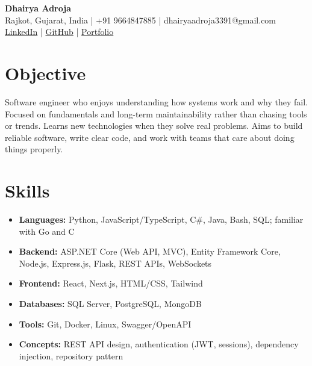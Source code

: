 \documentclass[11pt,a4paper]{article}
\begin{document}
\begin{center}
    {\huge \textbf{Dhairya Adroja}} \\
    \vspace{6pt}
    \small Rajkot, Gujarat, India | +91 9664847885 | dhairyaadroja3391@gmail.com \\
    \small \href{https://www.linkedin.com/in/adrojadhairya}{LinkedIn} | \href{https://github.com/Dhairya3391}{GitHub} | \href{https://pow.noobokay.me}{Portfolio}
\end{center}

\section{Objective}
\noindent Software engineer who enjoys understanding how systems work and why they fail. Focused on fundamentals and long-term maintainability rather than chasing tools or trends. Learns new technologies when they solve real problems. Aims to build reliable software, write clear code, and work with teams that care about doing things properly.

\section{Skills}
\begin{itemize}[leftmargin=*]
\item \textbf{Languages:} Python, JavaScript/TypeScript, C\#, Java, Bash, SQL; familiar with Go and C
\item \textbf{Backend:} ASP.NET Core (Web API, MVC), Entity Framework Core, Node.js, Express.js, Flask, REST APIs, WebSockets
\item \textbf{Frontend:} React, Next.js, HTML/CSS, Tailwind
\item \textbf{Databases:} SQL Server, PostgreSQL, MongoDB
\item \textbf{Tools:} Git, Docker, Linux, Swagger/OpenAPI
\item \textbf{Concepts:} REST API design, authentication (JWT, sessions), dependency injection, repository pattern
\end{itemize}

\end{document}
